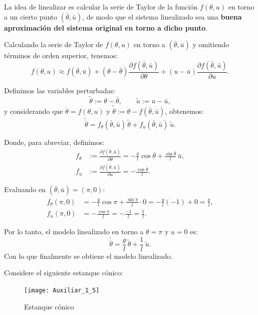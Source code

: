 \documentclass[
  11pt,
  letterpaper,
   addpoints,
   answers
  ]{exam}
\begin{document}
\begin{questions}
\begin{solution}
La idea de linealizar es calcular la serie de Taylor de la función $f(\theta, u)$ en torno a un cierto punto $(\bar{\theta}, \bar{u})$, de modo que el sistema linealizado sea una \textbf{buena aproximación del sistema original en torno a dicho punto}.

Calculando la serie de Taylor de $f(\theta, u)$ en torno a $(\bar{\theta}, \bar{u})$ y omitiendo términos de orden superior, tenemos:
\begin{equation}
    f(\theta, u) \approx f(\bar{\theta}, \bar{u}) 
    + (\theta - \bar{\theta}) \frac{\partial f(\bar{\theta}, \bar{u})}{\partial \theta} 
    + (u - \bar{u}) \frac{\partial f(\bar{\theta}, \bar{u})}{\partial u}.
\end{equation}

Definimos las variables perturbadas:
\begin{equation}
    \tilde{\theta} := \theta - \bar{\theta}, 
    \qquad 
    \tilde{u} := u - \bar{u},
\end{equation}
y considerando que $\ddot{\theta} = f(\theta, u)$ y $\tilde{\ddot{\theta}} := \ddot{\theta} - f(\bar{\theta}, \bar{u})$, obtenemos:
\begin{equation}
    \tilde{\ddot{\theta}} = f_{\theta}(\bar{\theta}, \bar{u}) \, \tilde{\theta} 
    + f_{u}(\bar{\theta}, \bar{u}) \, \tilde{u}.
\end{equation}

Donde, para abreviar, definimos:
\begin{align}
    f_{\theta} &:= \frac{\partial f(\bar{\theta}, \bar{u})}{\partial \theta} 
    = -\frac{g}{l} \cos \bar{\theta} + \frac{\sin \bar{\theta}}{l} \, \bar{u}, \\
    f_{u} &:= \frac{\partial f(\bar{\theta}, \bar{u})}{\partial u} 
    = -\frac{\cos \bar{\theta}}{l}.
\end{align}

Evaluando en $(\bar{\theta}, \bar{u}) = (\pi, 0)$:
\begin{align}
    f_{\theta}(\pi, 0) &= -\frac{g}{l} \cos \pi + \frac{\sin \pi}{l} \cdot 0 
    = -\frac{g}{l}(-1) + 0 
    = \frac{g}{l}, \\
    f_{u}(\pi, 0) &= -\frac{\cos \pi}{l} 
    = -\frac{-1}{l} 
    = \frac{1}{l}.
\end{align}

Por lo tanto, el modelo linealizado en torno a \(\theta = \pi\) y \(u = 0\) es:
\begin{equation}
    \tilde{\ddot{\theta}} = \frac{g}{l} \, \tilde{\theta} + \frac{1}{l} \, \tilde{u}.
\end{equation}
Con lo que finalmente se obtiene el modelo linealizado.
\end{solution}
\question Considere el siguiente estanque cónico:
\begin{figure}[ht]
    \centering
    \texttt{[image: Auxiliar\_1\_5]}
    \caption{Estanque cónico}
\end{figure}


\end{questions}
\end{document}
